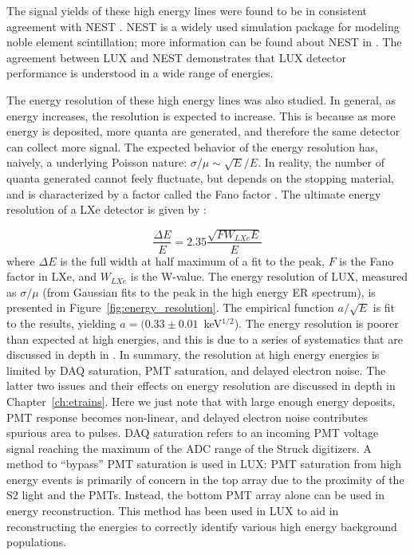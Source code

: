 The signal yields of these high energy lines were found to be in consistent agreement with \ac{NEST} \cite{LUX:YieldsAndRecombination}. \ac{NEST} is a widely used simulation package for modeling noble element scintillation; more information can be found about \ac{NEST} in \cite{Szydagis2011}. The agreement between \ac{LUX} and \ac{NEST} demonstrates that \ac{LUX} detector performance is understood in a wide range of energies. 

The energy resolution of these high energy lines was also studied. In general, as energy increases, the resolution is expected to increase. This is because as more energy is deposited, more quanta are generated, and therefore the same detector can collect more signal. The expected behavior of the energy resolution has, naively, a underlying Poisson nature: $\sigma / \mu \sim \sqrt{E}/E$. In reality, the number of quanta generated cannot feely fluctuate, but depends on the stopping material, and is characterized by a factor called the Fano factor \cite{Fano1947} \cite{Aprile2010}. The ultimate energy resolution of a \ac{LXe} detector is given by \cite{Aprile2010}: 

\begin{equation}
\frac{\Delta E}{E} = 2.35 \frac{\sqrt{F W_{LXe} E} }{E} 
\end{equation}
where $\Delta E$ is the full width at half maximum of a fit to the peak, $F$ is the Fano factor in \ac{LXe}, and $W_{LXe}$ is the W-value. The energy resolution of \ac{LUX}, measured as $\sigma / \mu$ (from Gaussian fits to the peak in the high energy \ac{ER} spectrum), is presented in Figure~\ref{fig:energy_resolution}. The empirical function $a / \sqrt{E} $ is fit to the results, yielding $a = (0.33 \pm 0.01$~keV$^{1/2}$). The energy resolution is poorer than expected at high energies, and this is due to a series of systematics that are discussed in depth in \cite{LUX:YieldsAndRecombination}. In summary, the resolution at high energy energies is limited by \ac{DAQ} saturation, \ac{PMT} saturation, and delayed electron noise. The latter two issues and their effects on energy resolution are discussed in depth in Chapter~\ref{ch:etrains}. Here we just note that with large enough energy deposits, \ac{PMT} response becomes non-linear, and delayed electron noise contributes spurious area to pulses. \ac{DAQ} saturation refers to an incoming \ac{PMT} voltage signal reaching the maximum of the \ac{ADC} range of the Struck digitizers. A method to ``bypass'' \ac{PMT} saturation is used in \ac{LUX}: \ac{PMT} saturation from high energy events is primarily of concern in the top array due to the proximity of the S2 light and the \ac{PMT}s. Instead, the bottom \ac{PMT} array alone can be used in energy reconstruction. This method has been used in \ac{LUX} to aid in reconstructing the energies to correctly identify various high energy background populations.

